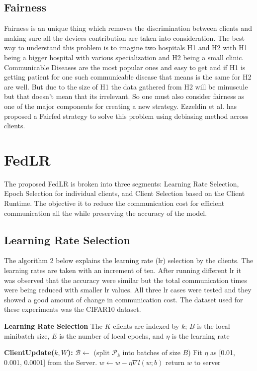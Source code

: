 \documentclass[conference]{IEEEtran}
\begin{document}
\subsection{Fairness}
Fairness is an unique thing which removes the discrimination between clients and making sure all the devices contribution are taken into consideration. The best way to understand this problem is to imagine two hospitals H1 and H2 with H1 being a bigger hospital with various specialization and H2 being a small clinic. Communicable Diseases are the most popular ones and easy to get and if H1 is getting patient for one such communicable disease that means is the same for H2 are well. But due to the size of H1 the data gathered from H2 will be minuscule but that doesn't mean that its irrelevant. So one must also consider fairness as one of the major components for creating a new strategy. Ezzeldin et al. \cite{ezzeldin2023fairfed} has proposed a Fairfed strategy to solve this problem using debiasing method across clients.
 
\section{FedLR}
The proposed FedLR is broken into three segments: Learning Rate Selection, Epoch Selection for individual clients, and Client Selection based on the Client Runtime. The objective it to reduce the communication cost for efficient communication all the while preserving the accuracy of the model.
 \subsection{Learning Rate Selection}
The algorithm 2 below explains the learning rate (lr) selection by the clients. The learning rates are taken with an increment of ten. After running different lr it was observed that the accuracy were similar but the total communication times were being reduced with smaller lr values. All three lr cases were tested and they showed a good amount of change in communication cost. The dataset used for these experiments was the CIFAR10 dataset.

 
 \begin{algorithm}[H]
 	\scriptsize
 	\caption{ \textbf{Learning Rate Selection} The $K$ clients are
 		indexed by $k$; $B$ is the local minibatch size, $E$ is the number
 		of local epochs, and $\eta$ is the learning rate}\label{alg:cap}
 	\begin{algorithmic}[1]
 		
 		
 		\State \textbf{ClientUpdate($k,W$):} 
 		\State $\mathcal{B} \gets$ (split $\mathcal{P}_k$ into batches of size $B$)
 		\State Fit $\eta$ as [0.01, 0.001, 0.0001] from the Server.
 		\State $w \gets w - \eta \nabla l(w;b)$
 		\EndFor
 		\EndFor
 		\State return $w$ to server
 		
 	\end{algorithmic}
 \end{algorithm}
 
\end{document}
